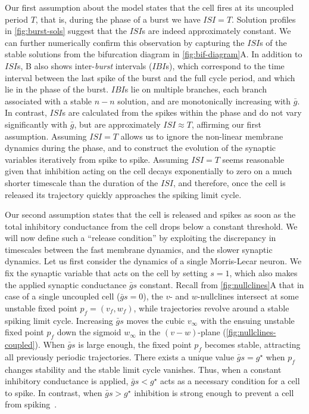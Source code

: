 Our first assumption about the model states that the \free{} cell fires at its uncoupled period \(T\), that is, during the \free{} phase of a burst we have \(ISI=T\).
Solution profiles in \cref{fig:burst-sols} suggest that the \(ISI\)s are indeed approximately constant.
We can further numerically confirm this observation by capturing the \(ISI\)s of the stable solutions from the bifurcation diagram in \cref{fig:bif-diagram}A.
In addition to \(ISI\)s, B also shows inter-\textit{burst} intervals (\(IBI\)s), which correspond to the time interval between the last spike of the burst and the full cycle period, and which lie in the \quiet{} phase of the burst.
\(IBI\)s lie on multiple branches, each branch associated with a stable \(n-n\) solution, and are monotonically increasing with \(\bar g\).
In contrast, \(ISI\)s are calculated from the spikes within the \free{} phase and do not vary significantly with \(\bar g\), but are approximately \(ISI\approx T\), affirming our first assumption.
Assuming \(ISI=T\) allows us to ignore the non-linear membrane dynamics during the \free{} phase, and to construct the evolution of the synaptic variables iteratively from spike to spike.
Assuming \(ISI=T\) seems reasonable given that inhibition acting on the \quiet{} cell decays exponentially to zero on a much shorter timescale than the duration of the \(ISI\), and therefore, once the \quiet{} cell is released its trajectory quickly approaches the spiking limit cycle.

Our second assumption states that the \quiet{} cell is released and spikes as soon as the total inhibitory conductance from the \free{} cell drops below a constant threshold.
We will now define such a ``release condition'' by exploiting the discrepancy in timescales between the fast membrane dynamics, and the slower synaptic dynamics.
Let us first consider the dynamics of a single Morris-Lecar neuron.
We fix the synaptic variable that acts on the cell by setting \(s=1\), which also makes the applied synaptic conductance \(\bar g s\) constant.
Recall from \cref{fig:nullclines}A that in case of a single uncoupled cell (\(\bar g s=0\)), the \(v\)- and \(w\)-nullclines intersect at some unstable fixed point \(p_{f}=(v_{f},w_{f})\), while trajectories revolve around a stable spiking limit cycle.
Increasing \(\bar g s\) moves the cubic \(v_{\infty}\) with the ensuing unstable fixed point \(p_{f}\) down the sigmoid \(w_{\infty}\) in the \((v-w)\)-plane (\cref{fig:nullclines-coupled}).
When \(\bar g s\) is large enough, the fixed point \(p_{f}\) becomes stable, attracting all previously periodic trajectories.
There exists a unique value \(\bar g s=g^{\star}\) when \(p_{f}\) changes stability and the stable limit cycle vanishes.
Thus, when a constant inhibitory conductance is applied, \(\bar g s<g^{\star}\) acts as a necessary condition for a cell to spike.
In contrast, when \(\bar g s>g^{\star}\) inhibition is strong enough to prevent a cell from spiking~\citep{bose2011}.

